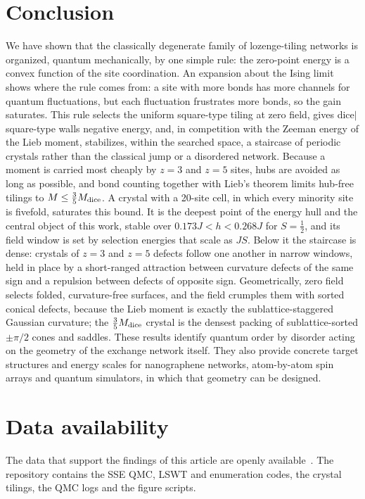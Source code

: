 \documentclass[prb,twocolumn,amsmath,amssymb,floatfix]{revtex4-2}
\newcommand{\Md}{M_{\rm dice}}
\begin{document}


\section{Conclusion}\label{sec:concl}

We have shown that the classically degenerate family of lozenge-tiling networks is organized, quantum mechanically, by one simple rule: the zero-point energy is a convex function of the site coordination. An expansion about the Ising limit shows where the rule comes from: a site with more bonds has more channels for quantum fluctuations, but each fluctuation frustrates more bonds, so the gain saturates. This rule selects the uniform square-type tiling at zero field, gives dice$|$square-type walls negative energy, and, in competition with the Zeeman energy of the Lieb moment, stabilizes, within the searched space, a staircase of periodic crystals rather than the classical jump or a disordered network. Because a moment is carried most cheaply by $z=3$ and $z=5$ sites, hubs are avoided as long as possible, and bond counting together with Lieb's theorem limits hub-free tilings to $M\le\frac35\Md$. A crystal with a 20-site cell, in which every minority site is fivefold, saturates this bound. It is the deepest point of the energy hull and the central object of this work, stable over $0.173J<h<0.268J$ for $S=\frac12$, and its field window is set by selection energies that scale as $JS$. Below it the staircase is dense: crystals of $z=3$ and $z=5$ defects follow one another in narrow windows, held in place by a short-ranged attraction between curvature defects of the same sign and a repulsion between defects of opposite sign. Geometrically, zero field selects folded, curvature-free surfaces, and the field crumples them with sorted conical defects, because the Lieb moment is exactly the sublattice-staggered Gaussian curvature; the $\frac35\Md$ crystal is the densest packing of sublattice-sorted $\pm\pi/2$ cones and saddles. These results identify quantum order by disorder acting on the geometry of the exchange network itself. They also provide concrete target structures and energy scales for nanographene networks, atom-by-atom spin arrays and quantum simulators, in which that geometry can be designed.

\section*{Data availability}
The data that support the findings of this article are openly available~\cite{DataRepo}. The repository contains the SSE QMC, LSWT and enumeration codes, the crystal tilings, the QMC logs and the figure scripts.
\end{document}
